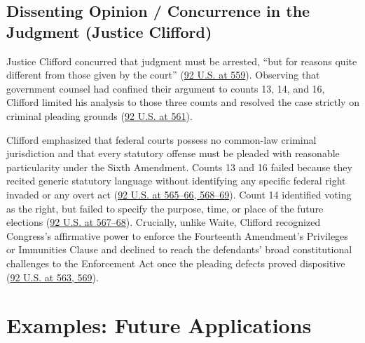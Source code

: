 \documentclass[12pt]{article}
\begin{document}
\subsection{Dissenting Opinion / Concurrence in the Judgment (Justice Clifford)}

Justice Clifford concurred that judgment must be arrested, ``but for reasons quite different from those given by the court'' (\href{https://supreme.justia.com/cases/federal/us/92/542/}{92 U.S. at 559}). Observing that government counsel had confined their argument to counts 13, 14, and 16, Clifford limited his analysis to those three counts and resolved the case strictly on criminal pleading grounds (\href{https://supreme.justia.com/cases/federal/us/92/542/}{92 U.S. at 561}).

Clifford emphasized that federal courts possess no common-law criminal jurisdiction and that every statutory offense must be pleaded with reasonable particularity under the Sixth Amendment. Counts 13 and 16 failed because they recited generic statutory language without identifying any specific federal right invaded or any overt act (\href{https://supreme.justia.com/cases/federal/us/92/542/}{92 U.S. at 565--66, 568--69}). Count 14 identified voting as the right, but failed to specify the purpose, time, or place of the future elections (\href{https://supreme.justia.com/cases/federal/us/92/542/}{92 U.S. at 567--68}). Crucially, unlike Waite, Clifford recognized Congress's affirmative power to enforce the Fourteenth Amendment's Privileges or Immunities Clause and declined to reach the defendants' broad constitutional challenges to the Enforcement Act once the pleading defects proved dispositive (\href{https://supreme.justia.com/cases/federal/us/92/542/}{92 U.S. at 563, 569}).

\section{Examples: Future Applications}
\end{document}

